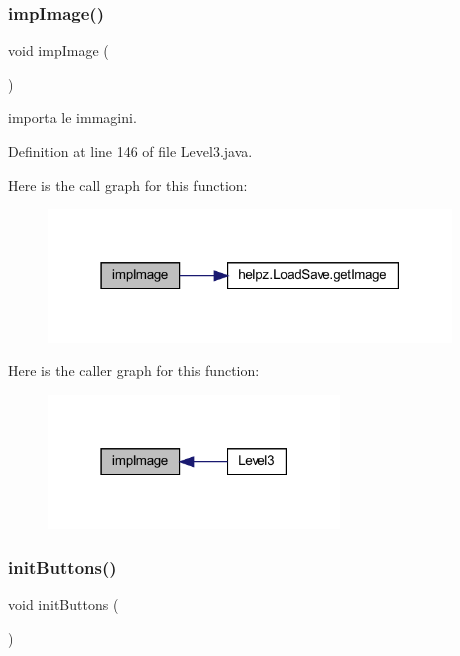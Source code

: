 \subsubsection{\texorpdfstring{imp\+Image()}{impImage()}}
{\footnotesize\ttfamily void imp\+Image (\begin{DoxyParamCaption}{ }\end{DoxyParamCaption})\hspace{0.3cm}{\ttfamily [private]}}



importa le immagini. 



Definition at line 146 of file Level3.\+java.

Here is the call graph for this function\+:
\nopagebreak
\begin{figure}[H]
\begin{center}
\leavevmode
\includegraphics[width=303pt]{classscenes_1_1_level3_aded9c531b53772fd90d09a8b6bf0132e_cgraph}
\end{center}
\end{figure}
Here is the caller graph for this function\+:\nopagebreak
\begin{figure}[H]
\begin{center}
\leavevmode
\includegraphics[width=219pt]{classscenes_1_1_level3_aded9c531b53772fd90d09a8b6bf0132e_icgraph}
\end{center}
\end{figure}
\mbox{\label{classscenes_1_1_level3_a27d3ba5afb772cc36c9a432c28975ace}} 
\subsubsection{\texorpdfstring{init\+Buttons()}{initButtons()}}
{\footnotesize\ttfamily void init\+Buttons (\begin{DoxyParamCaption}{ }\end{DoxyParamCaption})\hspace{0.3cm}{\ttfamily [private]}}



